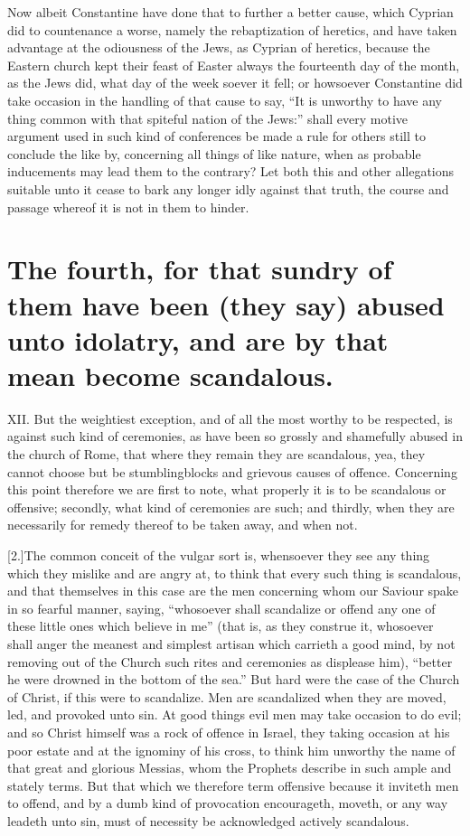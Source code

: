 Now albeit Constantine have done that to further a better cause, which Cyprian did to countenance a worse, namely the rebaptization of heretics, and have taken advantage at the odiousness of the Jews, as Cyprian of heretics, because the Eastern church kept their feast of Easter always the fourteenth day of the month, as the Jews did, what day of the week soever it fell; or howsoever Constantine did take occasion in the handling of that cause to say, “It is unworthy to have any thing common with that spiteful nation of the Jews:” shall every motive argument used in such kind of conferences be made a rule for others still to conclude the like by, concerning all things of like nature, when as probable inducements may lead them to the contrary? Let both this and other allegations suitable unto it cease to bark any longer idly against that truth, the course and passage whereof it is not in them to hinder.

\section*{The fourth, for that sundry of them have been (they say) abused unto idolatry, and are by that mean become scandalous. }

XII. But the weightiest exception, and of all the most worthy to be respected, is against such kind of ceremonies, as have been so grossly and shamefully abused in the church of Rome, that where they remain they are scandalous, yea,  they cannot choose but be stumblingblocks and grievous causes of offence. Concerning this point therefore we are first to note, what properly it is to be scandalous or offensive; secondly, what kind of ceremonies are such; and thirdly, when they are necessarily for remedy thereof to be taken away, and when not.

[2.]The common conceit of the vulgar sort is, whensoever they see any thing which they mislike and are angry at, to think that every such thing is scandalous, and that themselves in this case are the men concerning whom our Saviour spake in so fearful manner, saying, “whosoever shall scandalize or offend any one of these little ones which believe in me” (that is, as they construe it, whosoever shall anger the meanest and simplest artisan which carrieth a good mind, by not removing out of the Church such rites and ceremonies as displease him), “better he were drowned in the bottom of the sea.” But hard were the case of the Church of Christ, if this were to scandalize. Men are scandalized when they are moved, led, and provoked unto sin. At good things evil men may take occasion to do evil; and so Christ himself was a rock of offence in Israel, they taking occasion at his poor estate and at the ignominy of his cross, to think him unworthy the name of that great and glorious Messias, whom the Prophets describe in such ample and stately terms. But that which we therefore term offensive because it inviteth men to offend, and by a dumb kind of provocation encourageth, moveth, or any way leadeth unto sin, must of necessity be acknowledged actively scandalous.

